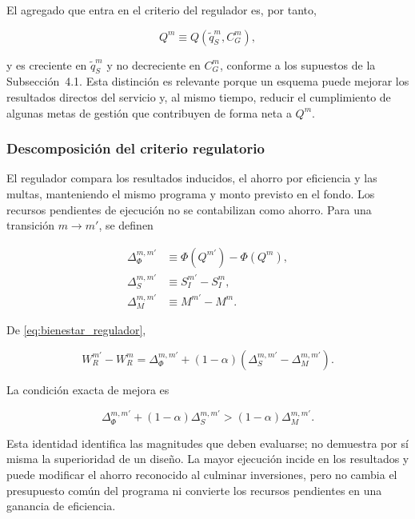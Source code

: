 El agregado que entra en el criterio del regulador es, por tanto,

\begin{equation}
\label{eq:resultado_regulador_por_esquema}
Q^m
\equiv
Q\!\left(
\widetilde q_S^m,
C_G^m
\right),
\end{equation}

y es creciente en \(\widetilde q_S^m\) y no decreciente en \(C_G^m\), conforme a los supuestos de la Subsección~4.1. Esta distinción es relevante porque un esquema puede mejorar los resultados directos del servicio y, al mismo tiempo, reducir el cumplimiento de algunas metas de gestión que contribuyen de forma neta a \(Q^m\).

\subsubsection{Descomposición del criterio regulatorio}

El regulador compara los resultados inducidos, el ahorro por eficiencia y las multas, manteniendo el mismo programa y monto previsto en el fondo. Los recursos pendientes de ejecución no se contabilizan como ahorro. Para una transición \(m\to m'\), se definen

\begin{subequations}
\label{eq:componentes_cambio_bienestar}
\begin{align}
\Delta_\Phi^{m,m'}&\equiv\Phi(Q^{m'})-\Phi(Q^m),\label{eq:cambio_valor_resultados}\\
\Delta_S^{m,m'}&\equiv S_I^{m'}-S_I^m,\label{eq:cambio_ahorro_bienestar}\\
\Delta_M^{m,m'}&\equiv M^{m'}-M^m.\label{eq:cambio_carga_multa_bienestar}
\end{align}
\end{subequations}

De \eqref{eq:bienestar_regulador},

\begin{equation}
\label{eq:cambio_bienestar_transicion}
W_R^{m'}-W_R^m=\Delta_\Phi^{m,m'}+(1-\alpha)(\Delta_S^{m,m'}-\Delta_M^{m,m'}).
\end{equation}

La condición exacta de mejora es

\begin{equation}
\label{eq:condicion_general_mejora_bienestar}
\Delta_\Phi^{m,m'}+(1-\alpha)\Delta_S^{m,m'}>(1-\alpha)\Delta_M^{m,m'}.
\end{equation}

Esta identidad identifica las magnitudes que deben evaluarse; no demuestra por sí misma la superioridad de un diseño. La mayor ejecución incide en los resultados y puede modificar el ahorro reconocido al culminar inversiones, pero no cambia el presupuesto común del programa ni convierte los recursos pendientes en una ganancia de eficiencia.

